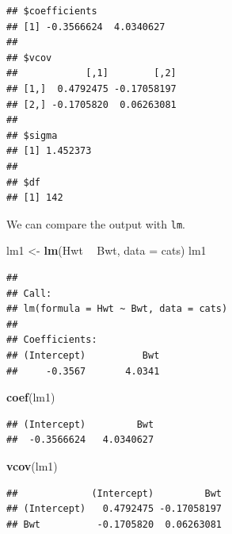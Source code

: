 \documentclass[]{book}
\newenvironment{Shaded}{\begin{snugshade}}{\end{snugshade}}
\newcommand{\KeywordTok}[1]{\textcolor[rgb]{0.13,0.29,0.53}{\textbf{#1}}}
\newcommand{\DataTypeTok}[1]{\textcolor[rgb]{0.13,0.29,0.53}{#1}}
\newcommand{\DecValTok}[1]{\textcolor[rgb]{0.00,0.00,0.81}{#1}}
\newcommand{\StringTok}[1]{\textcolor[rgb]{0.31,0.60,0.02}{#1}}
\newcommand{\OperatorTok}[1]{\textcolor[rgb]{0.81,0.36,0.00}{\textbf{#1}}}
\newcommand{\NormalTok}[1]{#1}
\theoremstyle{definition}
\theoremstyle{definition}
\theoremstyle{definition}
\theoremstyle{remark}
\begin{document}
\begin{Shaded}
\end{Shaded}

\begin{verbatim}
## $coefficients
## [1] -0.3566624  4.0340627
## 
## $vcov
##            [,1]        [,2]
## [1,]  0.4792475 -0.17058197
## [2,] -0.1705820  0.06263081
## 
## $sigma
## [1] 1.452373
## 
## $df
## [1] 142
\end{verbatim}

We can compare the output with \texttt{lm}.

\begin{Shaded}
\begin{Highlighting}[]
\NormalTok{lm1 <-}\StringTok{ }\KeywordTok{lm}\NormalTok{(Hwt }\OperatorTok{~}\StringTok{ }\NormalTok{Bwt, }\DataTypeTok{data =}\NormalTok{ cats)}
\NormalTok{lm1}
\end{Highlighting}
\end{Shaded}

\begin{verbatim}
## 
## Call:
## lm(formula = Hwt ~ Bwt, data = cats)
## 
## Coefficients:
## (Intercept)          Bwt  
##     -0.3567       4.0341
\end{verbatim}

\begin{Shaded}
\begin{Highlighting}[]
\KeywordTok{coef}\NormalTok{(lm1)}
\end{Highlighting}
\end{Shaded}

\begin{verbatim}
## (Intercept)         Bwt 
##  -0.3566624   4.0340627
\end{verbatim}

\begin{Shaded}
\begin{Highlighting}[]
\KeywordTok{vcov}\NormalTok{(lm1)}
\end{Highlighting}
\end{Shaded}

\begin{verbatim}
##             (Intercept)         Bwt
## (Intercept)   0.4792475 -0.17058197
## Bwt          -0.1705820  0.06263081
\end{verbatim}
\end{document}
